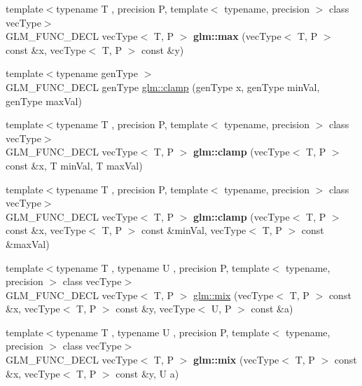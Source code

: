 \begin{DoxyCompactItemize}
\item 
\hypertarget{group__core__func__common_gad2ac6877ac7872a402ef5cae9bc6a30b}{{\footnotesize template$<$typename T , precision P, template$<$ typename, precision $>$ class vec\-Type$>$ }\\G\-L\-M\-\_\-\-F\-U\-N\-C\-\_\-\-D\-E\-C\-L vec\-Type$<$ T, P $>$ {\bfseries glm\-::max} (vec\-Type$<$ T, P $>$ const \&x, vec\-Type$<$ T, P $>$ const \&y)}\label{group__core__func__common_gad2ac6877ac7872a402ef5cae9bc6a30b}

\item 
{\footnotesize template$<$typename gen\-Type $>$ }\\G\-L\-M\-\_\-\-F\-U\-N\-C\-\_\-\-D\-E\-C\-L gen\-Type \hyperlink{group__core__func__common_ga93bce26c7d80d30a62f5c508f8498a6c}{glm\-::clamp} (gen\-Type x, gen\-Type min\-Val, gen\-Type max\-Val)
\item 
\hypertarget{group__core__func__common_gaf9deddb167a3055ca51cd9af3ce535f6}{{\footnotesize template$<$typename T , precision P, template$<$ typename, precision $>$ class vec\-Type$>$ }\\G\-L\-M\-\_\-\-F\-U\-N\-C\-\_\-\-D\-E\-C\-L vec\-Type$<$ T, P $>$ {\bfseries glm\-::clamp} (vec\-Type$<$ T, P $>$ const \&x, T min\-Val, T max\-Val)}\label{group__core__func__common_gaf9deddb167a3055ca51cd9af3ce535f6}

\item 
\hypertarget{group__core__func__common_ga240b9ec68274f12a2c4b6debf8979d1c}{{\footnotesize template$<$typename T , precision P, template$<$ typename, precision $>$ class vec\-Type$>$ }\\G\-L\-M\-\_\-\-F\-U\-N\-C\-\_\-\-D\-E\-C\-L vec\-Type$<$ T, P $>$ {\bfseries glm\-::clamp} (vec\-Type$<$ T, P $>$ const \&x, vec\-Type$<$ T, P $>$ const \&min\-Val, vec\-Type$<$ T, P $>$ const \&max\-Val)}\label{group__core__func__common_ga240b9ec68274f12a2c4b6debf8979d1c}

\item 
{\footnotesize template$<$typename T , typename U , precision P, template$<$ typename, precision $>$ class vec\-Type$>$ }\\G\-L\-M\-\_\-\-F\-U\-N\-C\-\_\-\-D\-E\-C\-L vec\-Type$<$ T, P $>$ \hyperlink{group__core__func__common_gadccbaffe46f369cf1a96b2aef92cbfdd}{glm\-::mix} (vec\-Type$<$ T, P $>$ const \&x, vec\-Type$<$ T, P $>$ const \&y, vec\-Type$<$ U, P $>$ const \&a)
\item 
\hypertarget{group__core__func__common_gaa51ef964cbf80ee9c2364d629693c8c8}{{\footnotesize template$<$typename T , typename U , precision P, template$<$ typename, precision $>$ class vec\-Type$>$ }\\G\-L\-M\-\_\-\-F\-U\-N\-C\-\_\-\-D\-E\-C\-L vec\-Type$<$ T, P $>$ {\bfseries glm\-::mix} (vec\-Type$<$ T, P $>$ const \&x, vec\-Type$<$ T, P $>$ const \&y, U a)}\label{group__core__func__common_gaa51ef964cbf80ee9c2364d629693c8c8}


\end{DoxyCompactItemize}
